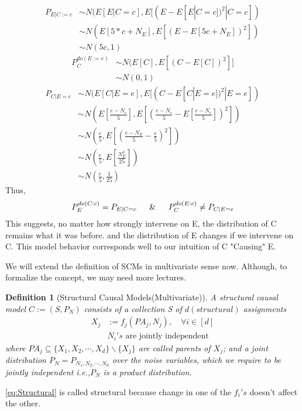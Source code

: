 \documentclass{article}
\newtheorem{definition}{Definition}[section]
\begin{document}
    \begin{align*}
        P_{E|C:=c} &\sim N(E[E|C=c],E[(E-E[E|C=c])^2|C=c])\\
        & \sim N(E[5*c+N_{E}],E[(E-E[5c+N_{E}])^2])\\
        & \sim N(5c,1)
    \end{align*}
    \begin{align*}
        P_C^{do(E:=e)}&\sim N(E[C],E[(C-E[C])^2]]\\
        &\sim N(0,1)
    \end{align*}
    \begin{align*}
        P_{C|E=e} &\sim N(E[C|E=e],E[(C-E[C|E=e])^2|E=e])\\
        &\sim N \left (E\left [\frac{e-N_{e}}{5} \right 
    ], E[\left( \frac{e-N_{e}}{5}-E\left [ \frac{e-N_{e}}{5}\right ]\right )^2]\right )\\
    & \sim N \left ( \frac{e}{5},E \left [ \left ( \frac{e-N_E}{5}-\frac{e}{5}\right )^2\right ]\right )\\
    & \sim N \left ( \frac{e}{5}, E \left [ \frac{N_E^2}{25}\right ]\right )\\
    & \sim N \left( \frac{e}{5},\frac{1}{25} \right)
    \end{align*}
    Thus,
    \begin{align}
        P_E^{do(C:c)}=P_{E|C=c} \quad \And \quad P_{C}^{do(E:e)} \neq P_{C|E=e}
    \end{align}
    This suggests, no matter how strongly intervene on E, the distribution of C remains what it was before.
    and the distribution of E changes if we intervene on C.
    This model behavior corresponds well to our intuition of C "Causing" E.

    We will extend the definition of SCMs in multivariate sense now. Although, to formalize the concept, we may need more lectures.
    \begin{definition}[Structural Causal Models(Multivariate)]
    A structural causal model $C:=(S,P_{N})$ consists of a collection S of $d(structural)$ assignments
    \begin{align}
      \label{eq:Structural}  X_{j}&:=f_{j}(PA_j,N_j), \quad \forall i\in [d]\\
        &\text{$N_{i}'s$ are jointly independent}
    \end{align}
    where $PA_{j} \subseteq \{ X_1,X_2,\cdots,X_{d}\} \backslash \{X_j\}$ are called parents of $X_j$; and a joint distribution $P_{N}=P_{N_1,N_2,\cdots,N_d}$ over the noise variables, which we require to be jointly independent i.e.,$P_N$ is a product distribution.
    \end{definition}
    \cref{eq:Structural} is called structural because change in one of the $f_i's$ doesn't affect the other.
\end{document}
